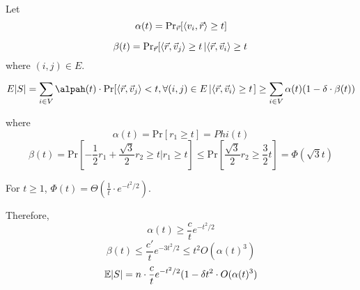 Let \[ \alpha(t)=\displaystyle\mathrm{Pr}_{\vec{r}}[\left<v_i,\vec{r}\right> \geq t] \]

\[\beta(t)=\mathrm{Pr}_{\vec{r}}[\left<\vec{r},\vec{v}_j\right> \geq t\left|\left<\vec{r},\vec{v}_i\right> \geq t\right. \]
where  $ (i,j)\in E $.

\[E|S|=\sum_{i\in V}\alpah(t)\cdot \mathrm{Pr}[\<\vec{r},\vec{v}_j\><t,\forall (i,j)\in E\left|\<\vec{r},\vec{v}_i\> \geq t\right.] \geq \sum_{i\in V}\alpha(t)(1-\delta\cdot \beta(t))\]

where 
\[\alpha(t)=\mathrm{Pr}[r_1 \geq t]=Phi(t)\]
\[\beta(t)=\mathrm{Pr}[-\frac{1}{2}r_1+\frac{\sqrt{3}}{2}r_2 \geq t|r_1 \geq t] \leq \mathrm{Pr}[\frac{\sqrt{3}}{2}r_2 \geq \frac{3}{2}t]=\Phi(\sqrt{3}t)\]

\begin{claim}
    For  $ t \geq 1 $,  $ \Phi(t)=\Theta(\frac{1}{t}\cdot e^{-t^2/2}) $.
    
\end{claim}

Therefore,
    \[\alpha(t) \geq \frac{c}{t}e^{-t^2/2}\]
    \[\beta(t) \leq \frac{c'}{t}e^{-3t^2/2} \leq t^2O(\alpha(t)^3)\]
    \[\mathbb E|S|=n\cdot \frac{c}{t}e^{-t^2/2}(1-\delta t^2\cdot O(\alpha(t)^3)\]

